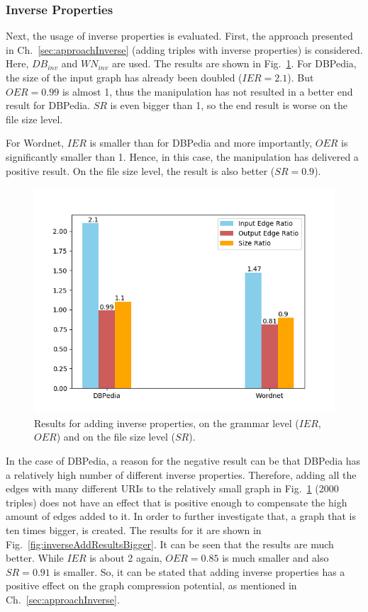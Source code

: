 \subsubsection{Inverse Properties}

Next, the usage of inverse properties is evaluated. First, the approach presented in Ch.~\ref{sec:approachInverse} (adding triples with inverse properties) is considered. Here, $DB_{inv}$ and $WN_{inv}$ are used. The results are shown in Fig.~\ref{fig:inverseAddResults}. For DBPedia, the size of the input graph has already been doubled ($IER=2.1$). But $OER=0.99$ is almost 1, thus the manipulation has not resulted in a better end result for DBPedia. $SR$ is even bigger than 1, so the end result is worse on the file size level.

For Wordnet, $IER$ is smaller than for DBPedia and more importantly, $OER$ is significantly smaller than 1. Hence, in this case, the manipulation has delivered a positive result. On the file size level, the result is also better ($SR=0.9$).

\begin{figure}
	\centering
	\includegraphics[width=0.8\linewidth]{figures/4_evaluation/ontology/ratiosInverseAdd}
	\caption{Results for adding inverse properties, on the grammar level ($IER$, $OER$) and on the file size level ($SR$).}
	\label{fig:inverseAddResults}
\end{figure}

In the case of DBPedia, a reason for the negative result can be that DBPedia has a relatively high number of different inverse properties. Therefore, adding all the edges with many different URIs to the relatively small graph in Fig.~\ref{fig:inverseAddResults} (2000 triples) does not have an effect that is positive enough to compensate the high amount of edges added to it. In order to further investigate that, a graph that is ten times bigger, is created. The results for it are shown in Fig.~\ref{fig:inverseAddResultsBigger}. It can be seen that the results are much better. While $IER$ is about 2 again, $OER=0.85$ is much smaller and also $SR=0.91$ is smaller. So, it can be stated that adding inverse properties has a positive effect on the graph compression potential, as mentioned in Ch.~\ref{sec:approachInverse}.


